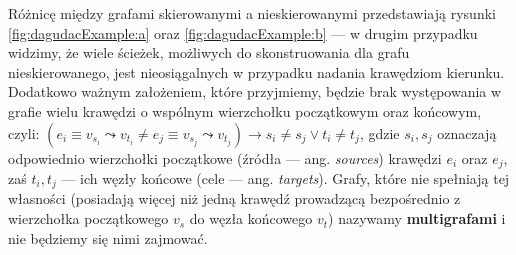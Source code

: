 Różnicę między grafami skierowanymi a nieskierowanymi przedstawiają rysunki \ref{fig:dagudacExample:a} oraz \ref{fig:dagudacExample:b} --- w drugim przypadku widzimy, że wiele ścieżek, możliwych do skonstruowania dla grafu nieskierowanego, jest nieosiągalnych w przypadku nadania krawędziom kierunku. Dodatkowo ważnym założeniem, które przyjmiemy, będzie brak występowania w grafie wielu krawędzi o wspólnym wierzchołku początkowym oraz końcowym, czyli: $\left( e_{i} \equiv v_{s_{i}} \leadsto v_{t_{i}} \neq e_{j} \equiv v_{s_{j}} \leadsto v_{t_{j}} \right) \rightarrow s_{i} \neq s_{j} \vee t_{i} \neq t_{j}$, gdzie $s_{i}, s_{j}$ oznaczają odpowiednio wierzchołki początkowe (źródła --- ang. \textit{sources}) krawędzi $e_{i}$ oraz $e_{j}$, zaś $t_{i}, t_{j}$ --- ich węzły końcowe (cele --- ang. \textit{targets}). Grafy, które nie spełniają tej własności (posiadają więcej niż jedną krawędź prowadzącą bezpośrednio z wierzchołka początkowego $v_{s}$ do węzła końcowego $v_{t}$) nazywamy \textbf{multigrafami} i nie będziemy się nimi zajmować.

